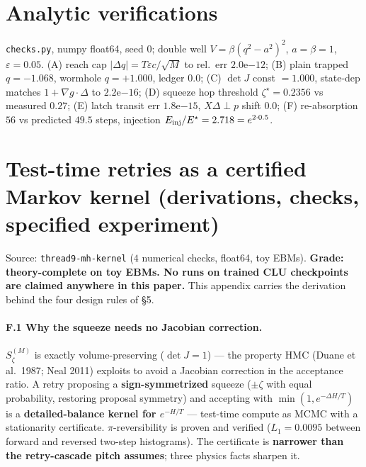 \documentclass[11pt]{article}
\newcommand{\detJ}{\det J}
\begin{document}
\section{Analytic verifications}
\texttt{checks.py}, numpy float64, seed 0; double well $V=\beta(q^2-a^2)^2$, $a=\beta=1$, $\varepsilon=0.05$. (A) reach cap $|\Delta q|=T\varepsilon c/\sqrt{M}$ to rel.\ err $2.0\mathrm{e}{-12}$; (B) plain trapped $q=-1.068$, wormhole $q=+1.000$, ledger $0.0$; (C) $\detJ$ const $=1.000$, state-dep matches $1+\nabla g\cdot\Delta$ to $2.2\mathrm{e}{-16}$; (D) squeeze hop threshold $\zeta^\star=0.2356$ vs measured $0.27$; (E) latch transit err $1.8\mathrm{e}{-15}$, $X\Delta\perp p$ shift $0.0$; (F) re-absorption $56$ vs predicted $49.5$ steps, injection $E_{\rm inj}/E^\star=2.718=e^{2\cdot0.5}$.

\section{Test-time retries as a certified Markov kernel (derivations, checks, specified experiment)}
Source: \texttt{thread9-mh-kernel} ($4$ numerical checks, float64, toy EBMs). \textbf{Grade: theory-complete on toy EBMs. No runs on trained CLU checkpoints are claimed anywhere in this paper.} This appendix carries the derivation behind the four design rules of \S5.

\paragraph{F.1 Why the squeeze needs no Jacobian correction.} $S^{(M)}_\zeta$ is exactly volume-preserving ($\detJ=1$) --- the property HMC (Duane et al.\ 1987; Neal 2011) exploits to avoid a Jacobian correction in the acceptance ratio. A retry proposing a \textbf{sign-symmetrized} squeeze ($\pm\zeta$ with equal probability, restoring proposal symmetry) and accepting with $\min(1,e^{-\Delta H/T})$ is a \textbf{detailed-balance kernel for $e^{-H/T}$} --- test-time compute as MCMC with a stationarity certificate. $\pi$-reversibility is proven and verified ($L_1=0.0095$ between forward and reversed two-step histograms). The certificate is \textbf{narrower than the retry-cascade pitch assumes}; three physics facts sharpen it.
\end{document}
